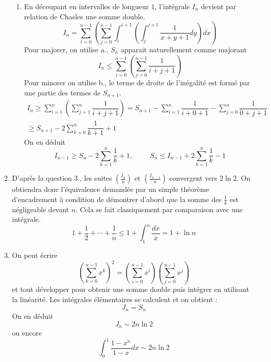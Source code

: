 \begin{enumerate}
\begin{enumerate}
\item En découpant en intervalles de longueur $1$, l'intégrale $I_n$ devient par relation de Chasles une somme double.
\begin{displaymath}
 I_n = \sum_{i=0}^{n-1}\left( \sum_{j=0}^{n-1}\int_{i}^{i+1}\left( \int _{j}^{j+1} \dfrac{1}{x+y+1}dy\right) dx \right) 
\end{displaymath}
Pour majorer, on utilise a., $S_n$ apparait naturellement comme majorant
\begin{displaymath}
 I_n \leq
\sum_{i=0}^{n-1}\left( \sum_{j=0}^{n-1} \dfrac{1}{i+j+1}\right) 
\end{displaymath}
Pour minorer on utilise b., le terme de droite de l'inégalité est formé par une partie des termes de $S_{n+1}$.
\begin{multline*}
 I_n \geq
\sum_{i=1}^{n}\left( \sum_{j=1}^{n} \dfrac{1}{i+j+1}\right) = S_{n+1} -
\sum_{i=1}^n\dfrac{1}{i+0+1} - \sum_{j=0}^n\dfrac{1}{0+j+1} \\
\geq S_{n+1} -2\sum_{k=0}^n\dfrac{1}{k+1}+1 
\end{multline*}
On en déduit
\begin{displaymath}
 I_{n-1} \geq S_n -2\sum_{k=1}^n\dfrac{1}{k}+1,\hspace{1cm}
 S_n \leq I_{n-1} +2\sum_{k=1}^n\dfrac{1}{k} - 1
\end{displaymath}
\end{enumerate}

\item D'après la question 3., les suites $(\frac{I_n}{n})$ et $(\frac{I_{n-1}}{n})$ convergent vers $2\ln2$. On obtiendra donc l'équivalence demandée par un simple théorème d'encadrement à condition de démontrer d'abord que la somme des $\frac{1}{k}$ est négligeable devant $n$. Cela se fait classiquement par comparaison avec une intégrale.
\begin{displaymath}
 1+\dfrac{1}{2}+\cdots+\dfrac{1}{n}\leq
1 +\int_{1}^{n}\dfrac{dx}{x}
= 1 + \ln n
\end{displaymath}
\item On peut écrire
\begin{displaymath}
 \left( \sum _{k=0}^{n-1}x^k\right)^2 = \left( \sum _{i=0}^{n-1}x^i\right)\left( \sum _{j=0}^{n-1}x^j\right)
\end{displaymath}
et tout développer pour obtenir une somme double puis intégrer en utilisant la linéarité. Les intégrales élémentaires se calculent et on obtient :
\begin{displaymath}
 J_n = S_n
\end{displaymath}
On en déduit
\begin{displaymath}
 J_n \sim 2n\ln 2
\end{displaymath}
ou encore
\begin{displaymath}
 \int_{0}^1\dfrac{1-x^n}{1-x}dx \sim 2n\ln 2
\end{displaymath}

\end{enumerate}
